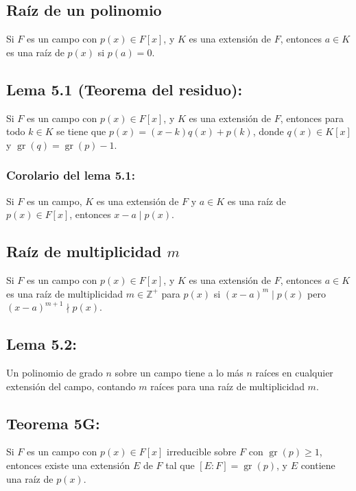 \documentclass{article}
\DeclareMathOperator{\gr}{gr}
\begin{document}
\subsection*{\color{violet} Raíz de un polinomio}

Si $F$ es un campo con $p(x)\in F[x]$, y $K$ es una extensión de $F$, entonces $a\in K$ es una raíz de $p(x)$ si $p(a)=0$.

\subsection*{\color{blue} Lema 5.1 (Teorema del residuo):}

Si $F$ es un campo con $p(x)\in F[x]$, y $K$ es una extensión de $F$, entonces para todo $k\in K$ se tiene que $p(x)=(x-k)q(x)+p(k)$, donde $q(x)\in K[x]$ y $\gr(q)=\gr(p)-1$.

\subsubsection*{\color{blue} Corolario del lema 5.1:}

Si $F$ es un campo, $K$ es una extensión de $F$ y $a\in K$ es una raíz de $p(x)\in F[x]$, entonces $x-a\mid p(x)$.

\subsection*{\color{violet} Raíz de multiplicidad $m$}

Si $F$ es un campo con $p(x)\in F[x]$, y $K$ es una extensión de $F$, entonces $a\in K$ es una raíz de multiplicidad $m\in\mathbb{Z}^+$ para $p(x)$ si $(x-a)^m\mid p(x)$ pero $(x-a)^{m+1}\nmid p(x)$.

\subsection*{\color{blue} Lema 5.2:}

Un polinomio de grado $n$ sobre un campo tiene a lo más $n$ raíces en cualquier extensión del campo, contando $m$ raíces para una raíz de multiplicidad $m$.

\subsection*{\color{red} Teorema 5G:}

Si $F$ es un campo con $p(x)\in F[x]$ irreducible sobre $F$ con $\gr(p)\geq 1$, entonces existe una extensión $E$ de $F$ tal que $[E:F]=\gr(p)$, y $E$ contiene una raíz de $p(x)$.
\end{document}
